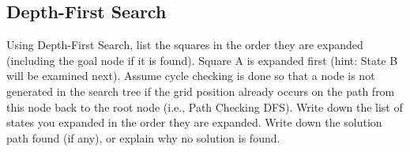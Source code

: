 \documentclass[12pt,letterpaper,titlepage]{article}
\begin{document}
\subsection[Part 1]{Depth-First Search}
\label{1part1}
Using Depth-First Search, list the squares in the order they are expanded (including the goal node if it is found). Square A is expanded first (hint: State B will be examined next). Assume cycle checking is done so that a node is not generated in the search tree if the grid position already occurs on the path from this node back to the root node (i.e., Path Checking DFS). Write down the list of states you expanded in the order they are expanded. Write down the solution path found (if any), or explain why no solution is found.
\\\\
\end{document}

